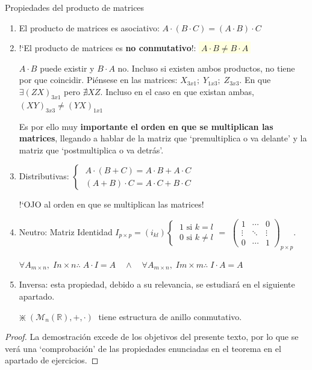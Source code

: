 \begin{prop}{Propiedades del producto de matrices}

\begin{enumerate}

\item El producto de matrices es asociativo: $A\cdot(B\cdot C)=(A\cdot B)\cdot C$
\item !`El producto de matrices es \textbf{no conmutativo}!:  \colorbox{LightYellow}{$\boxed{ \; A\cdot B \neq B\cdot A \; }$}

\vspace{2mm}
$A\cdot B$ puede existir y $B\cdot A$ no. Incluso si existen ambos productos, no tiene por que coincidir. Piénsese en las matrices: $X_{3x1}; \; Y_{1x3}; \; Z_{3x3}$. En que $\exists (ZX)_{3x1}$ pero $\nexists XZ$. Incluso en el caso en que existan ambas, $(XY)_{3x3}\neq (YX)_{1x1}$

Es por ello muy \textbf{importante el orden en que se multiplican las matrices}, llegando a hablar de la matriz que `premultiplica o va delante' y la matriz que `postmultiplica o va detrás'.

\item Distributivas: $\begin{cases} \; A\cdot (B+C)=A\cdot B + A\cdot C \\  \; (A+B)\cdot C=A\cdot C+ B\cdot C   \end{cases}$


\vspace{2mm} !`OJO al orden en que se multiplican las matrices!	


\item Neutro: Matriz Identidad $I_{p\times p}=(i_{kl}) \begin{cases} \; 1 \text{ si } k=l \\ \; 0 \text{ si } k\neq l \end{cases} =$ 
\small{$\left( \begin{matrix} 1 & \cdots & 0 \\ \vdots & \ddots & \vdots \\ 0 & \cdots & 1  \end{matrix}\right)_{p\times p}$}\normalsize{.}

$\forall A_{m \times n}, \; I{n\times n} \therefore \;  A\cdot I=A \quad \wedge \quad \forall A_{m \times n}, \; I{m\times m} \therefore \;  I\cdot A=A $

\item Inversa: esta propiedad, debido a su relevancia, se estudiará en el siguiente apartado.

\vspace{3mm} \textcolor{gris}{$\divideontimes \; (\mathcal M_{n}(\mathbb R) , + , \cdot)\; $ tiene estructura de anillo conmutativo.}
\end{enumerate}
	
\end{prop}
\begin{proof}
La demostración excede de los objetivos del presente texto, por lo que se verá una `comprobación' de las propiedades enunciadas en el  teorema en el apartado de ejercicios.	
\end{proof}

